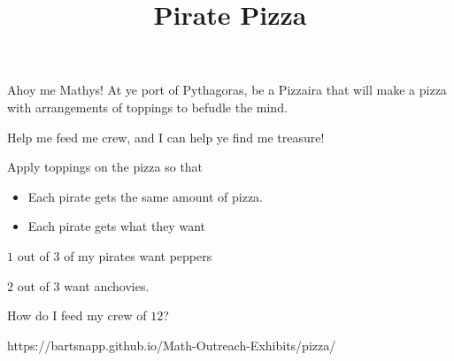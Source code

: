 \documentclass{../exhibit}
\title{Pirate Pizza}
\begin{document}
\begin{context}
  Ahoy me Mathys! At ye port of Pythagoras, be a Pizzaira that will
  make a pizza with arrangements of toppings to befudle the mind.


  \vspace{1cm}

  
  Help me feed me crew, and I can help ye find me treasure!
\end{context}



\begin{directions}
  Apply toppings on the pizza so that
  \begin{itemize}
  \item Each pirate gets the same amount of pizza.
  \item Each pirate gets what they want
  \end{itemize}
\end{directions}



\begin{example}
  $1$ out of $3$ of my pirates want peppers

  $2$ out of $3$ want anchovies.


  How do I feed my crew of $12$?
\begin{center}
\end{center}
\end{example}



\begin{mathConnections}
  https://bartsnapp.github.io/Math-Outreach-Exhibits/pizza/
\end{mathConnections}
\end{document}
